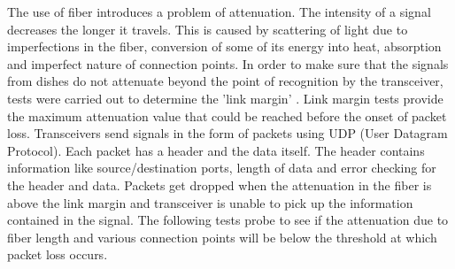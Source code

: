 \documentclass{article}
\begin{document}
The use of fiber introduces a problem of attenuation. The intensity of a signal decreases the longer it travels. This is caused by scattering of light due to imperfections in the fiber, conversion of some of its energy into heat, absorption and imperfect nature of connection points.  In order to make sure that the signals from dishes do not attenuate beyond the point of recognition by the transceiver, tests were carried out to determine the 'link margin' . Link margin tests provide the maximum attenuation value that could be reached before the onset of packet loss.  Transceivers send signals in the form of packets using UDP (User Datagram Protocol). Each packet has a header and the data itself. The header contains information like source/destination ports, length of data and error checking for the header and data. Packets get dropped when the attenuation in the fiber is above the link margin and transceiver is unable to pick up the information contained in the signal. The following tests probe to see if the attenuation due to fiber length and various connection points will be below the threshold at which packet loss occurs. 
\end{document}
